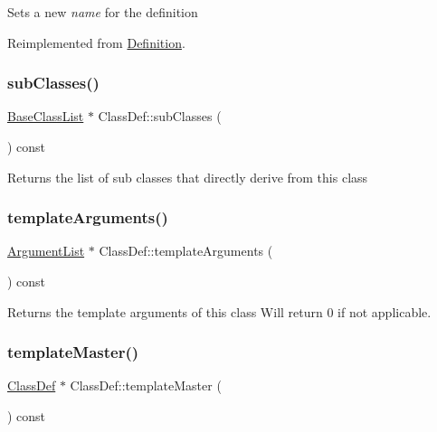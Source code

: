 Sets a new {\itshape name} for the definition 

Reimplemented from \mbox{\hyperlink{class_definition_aaa3c1632bd89cb3db7c7713df4e36db0}{Definition}}.

\mbox{\label{class_class_def_aeb1cb317a13036ab2689586513b92f83}} 
\subsubsection{\texorpdfstring{subClasses()}{subClasses()}}
{\footnotesize\ttfamily \mbox{\hyperlink{class_base_class_list}{Base\+Class\+List}} $\ast$ Class\+Def\+::sub\+Classes (\begin{DoxyParamCaption}{ }\end{DoxyParamCaption}) const}

Returns the list of sub classes that directly derive from this class \mbox{\label{class_class_def_a6e46b01e96d3c49b41f9b883147162bd}} 
\subsubsection{\texorpdfstring{templateArguments()}{templateArguments()}}
{\footnotesize\ttfamily \mbox{\hyperlink{class_argument_list}{Argument\+List}} $\ast$ Class\+Def\+::template\+Arguments (\begin{DoxyParamCaption}{ }\end{DoxyParamCaption}) const}

Returns the template arguments of this class Will return 0 if not applicable. \mbox{\label{class_class_def_aa592db91c3b33a7b4089910f1e987a40}} 
\subsubsection{\texorpdfstring{templateMaster()}{templateMaster()}}
{\footnotesize\ttfamily \mbox{\hyperlink{class_class_def}{Class\+Def}} $\ast$ Class\+Def\+::template\+Master (\begin{DoxyParamCaption}{ }\end{DoxyParamCaption}) const}

